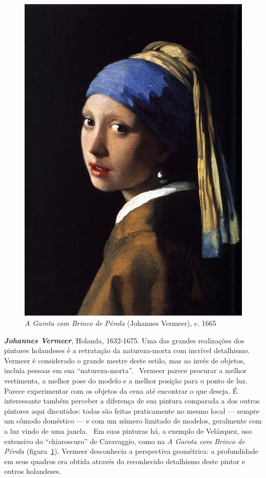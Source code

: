 \begin{figure}
  \vspace{-15pt}
  \begin{centering}
    \caption{\emph{A Garota com Brinco de Pérola} (Johannes Vermeer), c. 1665}
    \label{fig:vermeer:perola}
    \includegraphics[scale=1.3]{figs/vermeer_perola.png}
  \end{centering}
\end{figure}

\textbf{\emph{Johannes Vermeer}}, Holanda, 1632-1675. Uma das grandes realizações dos
pintores holandeses é a retratação da natureza-morta com incrível
detalhismo.~\cite{wadum} Vermeer é considerado o grande mestre deste
estilo, mas ao invés de objetos, incluía pessoas em sua
``natureza-morta''.~\cite{gombrich} Vermeer parece procurar a melhor
vestimenta, a melhor pose do modelo e a melhor posição para o ponto de
luz. Parece experimentar com os objetos da cena até encontrar o que
deseja. É interessante também perceber a diferença de sua pintura
comparada a dos outros pintores aqui discutidos: todas são feitas
praticamente no mesmo local --- sempre um cômodo doméstico --- e com
um número limitado de modelos, geralmente com a luz vindo de uma
janela.~\cite{wadum1998}  Em suas pinturas há, a exemplo de Velázquez,
uso extensivo do ``chiaroscuro'' de Caravaggio, como na \textit{A
Garota com Brinco de Pérola}
(figura~\ref{fig:vermeer:perola}). Vermeer desconhecia a perspectiva
geométrica: a profundidade em seus quadros era obtida através do
reconhecido detalhismo deste pintor e outros holandeses.

